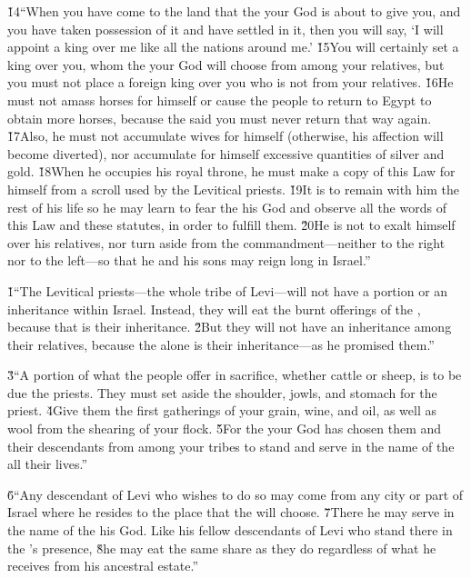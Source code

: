 \v{14}``When you have come to the land that the  your God is about to give you, and you have taken possession of it and have settled in it, then you will say, `I will appoint a king over me like all the nations around me.' \v{15}You will certainly set a king over you, whom the  your God will choose from among your relatives, but you must not place a foreign king over you who is not from your relatives. \v{16}He must not amass horses for himself or cause the people to return to Egypt to obtain more horses, because the  said you must never return that way again. \v{17}Also, he must not accumulate wives for himself (otherwise, his affection will become diverted), nor accumulate for himself excessive quantities of silver and gold. \v{18}When he occupies his royal throne, he must make a copy of this Law for himself from a scroll used by the Levitical priests. \v{19}It is to remain with him the rest of his life so he may learn to fear the  his God and observe all the words of this Law and these statutes, in order to fulfill them. \v{20}He is not to exalt himself over his relatives, nor turn aside from the commandment---neither to the right nor to the left---so that he and his sons may reign long in Israel.''

\v{1}``The Levitical priests---the whole tribe of Levi---will not have a portion or an inheritance within Israel. Instead, they will eat the burnt offerings of the , because that is their inheritance. \v{2}But they will not have an inheritance among their relatives, because the  alone is their inheritance---as he promised them.''

\v{3}``A portion of what the people offer in sacrifice, whether cattle or sheep, is to be due the priests. They must set aside the shoulder, jowls, and stomach for the priest. \v{4}Give them the first gatherings of your grain, wine, and oil, as well as wool from the shearing of your flock. \v{5}For the  your God has chosen them and their descendants from among your tribes to stand and serve in the name of the  all their lives.''

\v{6}``Any descendant of Levi who wishes to do so may come from any city or part of Israel where he resides to the place that the  will choose. \v{7}There he may serve in the name of the  his God. Like his fellow descendants of Levi who stand there in the 's presence, \v{8}he may eat the same share as they do regardless of what he receives from his ancestral estate.''

